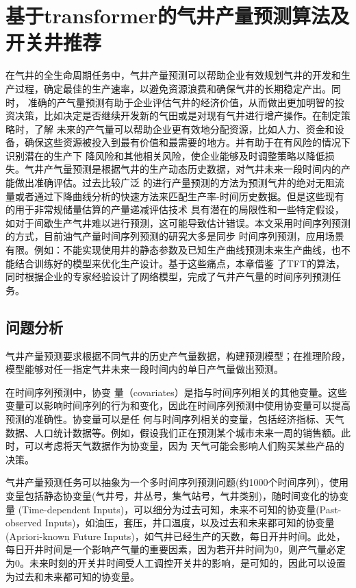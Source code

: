 \chapter{基于transformer的气井产量预测算法及开关井推荐}
在气井的全生命周期任务中，气井产量预测可以帮助企业有效规划气井的开发和生产过程，确定最佳的生产速率，以避免资源浪费和确保气井的长期稳定产出。同时，
准确的产气量预测有助于企业评估气井的经济价值，从而做出更加明智的投资决策，比如决定是否继续开发新的气田或是对现有气井进行增产操作。在制定策略时，了解
未来的产气量可以帮助企业更有效地分配资源，比如人力、资金和设备，确保这些资源被投入到最有价值和最需要的地方。并有助于在有风险的情况下识别潜在的生产下
降风险和其他相关风险，使企业能够及时调整策略以降低损失。气井产气量预测是根据气井的生产动态历史数据，对气井未来一段时间内的产能做出准确评估。过去比较广泛
的进行产量预测的方法为预测气井的绝对无阻流量或者通过下降曲线分析的快速方法来匹配生产率-时间历史数据。但是这些现有的用于非常规储量估算的产量递减评估技术
具有潜在的局限性和一些特定假设，如对于间歇生产气井难以进行预测，这可能导致估计错误。本文采用时间序列预测的方式，目前油气产量时间序列预测的研究大多是同步
时间序列预测，应用场景有限。例如：不能实现使用井的静态参数及已知生产曲线预测未来生产曲线，也不能结合训练好的模型来优化生产设计。基于这些痛点，本章借鉴
了TFT的算法，同时根据企业的专家经验设计了网络模型，完成了气井产气量的时间序列预测任务。
\section{问题分析}
气井产量预测要求根据不同气井的历史产气量数据，构建预测模型；在推理阶段，模型能够对任一指定气井未来一段时间内的单日产气量做出预测。

在时间序列预测中，协变
量（covariates）是指与时间序列相关的其他变量。这些变量可以影响时间序列的行为和变化，因此在时间序列预测中使用协变量可以提高预测的准确性。协变量可以是任
何与时间序列相关的变量，包括经济指标、天气数据、人口统计数据等。例如，假设我们正在预测某个城市未来一周的销售额。此时，可以考虑将天气数据作为协变量，因为
天气可能会影响人们购买某些产品的决策。

气井产量预测任务可以抽象为一个多时间序列预测问题(约1000个时间序列)，使用变量包括静态协变量(气井号，井丛号，集气站号，气井类别)，随时间变化的协变量
(Time-dependent Inputs)，可以细分为过去可知，未来不可知的协变量(Past-observed Inputs)，如油压，套压，井口温度，以及过去和未来都可知的协变量
(Apriori-known Future Inputs)，如气井已经生产的天数，每日开井时间。此处，每日开井时间是一个影响产气量的重要因素，因为若开井时间为0，则产气量必定
为0。未来时刻的开关井时间受人工调控开关井的影响，是可知的，因此可以设置为过去和未来都可知的协变量。
